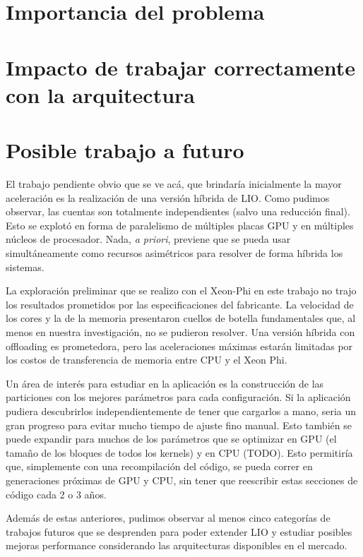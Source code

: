 \section{Importancia del problema}
\section{Impacto de trabajar correctamente con la arquitectura}
\section{Posible trabajo a futuro}
El trabajo pendiente obvio que se ve ac\'a, que brindar\'ia inicialmente la mayor aceleraci\'on
es la realizaci\'on de una versi\'on h\'ibrida de LIO. Como pudimos observar, las cuentas son
totalmente independientes (salvo una reducci\'on final). Esto se explot\'o en forma de paralelismo
de m\'ultiples placas GPU y en m\'ultiples n\'ucleos de procesador. Nada, \textit{a priori}, previene
que se pueda usar simult\'aneamente como recursos asim\'etricos para resolver de forma h\'ibrida los sistemas.

La exploraci\'on preliminar que se realizo con el Xeon-Phi en este trabajo no trajo los resultados
prometidos por las especificaciones del fabricante. La velocidad de los cores y la de la memoria
presentaron cuellos de botella fundamentales que, al menos en nuestra investigaci\'on, no se
pudieron resolver. Una versi\'on h\'ibrida con offloading es prometedora, pero las aceleraciones m\'aximas
estar\'an limitadas por los costos de transferencia de memoria entre CPU y el Xeon Phi.

Un \'area de inter\'es para estudiar en la aplicaci\'on es la construcci\'on de las particiones
con los mejores par\'ametros para cada configuraci\'on. Si la aplicaci\'on pudiera descubrirlos
independientemente de tener que cargarlos a mano, seria un gran progreso para evitar mucho
tiempo de ajuste fino manual. Esto tambi\'en se puede expandir para muchos de los par\'ametros
que se optimizar en GPU (el tama\~no de los bloques de todos los kernels) y en CPU (TODO).
Esto permitir\'ia que, simplemente con una recompilaci\'on del c\'odigo, se pueda correr en generaciones
pr\'oximas de GPU y CPU, sin tener que reescribir estas secciones de c\'odigo cada 2 o 3 a\~nos.

Adem\'as de estas anteriores, pudimos observar al menos cinco categor\'ias de trabajos futuros que se
desprenden para poder extender LIO y estudiar posibles mejoras performance considerando
las arquitecturas disponibles en el mercado.
